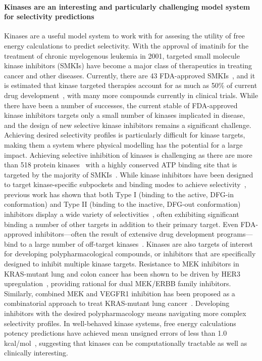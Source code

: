 \documentclass[9pt,lineno]{elife-modified} %
\begin{document}
\paragraph{Kinases are an interesting and particularly challenging model system for selectivity predictions}
Kinases are a useful model system to work with for assesing the utility of free energy calculations to predict selectivity. With the approval of imatinib for the treatment of chronic myelogenous leukemia in 2001, targeted small molecule kinase inhibitors (SMKIs) have become a major class of therapeutics in treating cancer and other diseases. 
Currently, there are 43 FDA-approved SMKIs~\citep{fda-approved-kinase-inhibitors}, and it is estimated that kinase targeted therapies account for as much as 50\% of current drug development~\citep{Santos:Nat.Rev.DrugDiscov.:2016}, with many more compounds currently in clinical trials. 
While there have been a number of successes, the current stable of FDA-approved kinase inhibitors targets only a small number of kinases implicated in disease, and the design of new selective kinase inhibitors remains a significant challenge.
Achieving desired selectivity profiles is particularly difficult for kinase targets, making them a system where physical modelling has the potential for a large impact. Achieving selective inhibition of kinases is challenging as there are more than 518 protein kinases~\citep{Volkamer2015-jx,Manning2002-cw} with a highly conserved ATP binding site that is targeted by the majority of SMKIs~\citep{Wu2015-oq}.
While kinase inhibitors have been designed to target kinase-specific subpockets and binding modes to achieve selectivity~\citep{Cowan-Jacob2007-rn,Seeliger2007-jn,Huse2002-ml,Harrison2003-ct,Volkamer2016-sj,ChristmannFranck:2016gka}, previous work has shown that both Type I (binding to the active, DFG-in conformation) and Type II (binding to the inactive, DFG-out conformation) inhibitors display a wide variety of selectivities~\citep{Anastassiadis2011-sm,Davis:Nat.Biotechnol.:2011}, often exhibiting significant binding a number of other targets in addition to their primary target. 
Even FDA-approved inhibitors---often the result of extensive drug development programs---bind to a large number of off-target kinases~\citep{Klaeger2017-jr}. Kinases are also targets of interest for developing polypharmacological compounds, or inhibitors that are specifically designed to inhibit multiple kinase targets. Resistance to MEK inhibitors in KRAS-mutant lung and colon cancer has been shown to be driven by HER3 upregulation~\citep{Sun:2014kt}, providing rational for dual MEK/ERBB family inhibitors. Similarly, combined MEK and VEGFR1 inhibition has been proposed as a combinatorial approach to treat KRAS-mutant lung cancer~\citep{Manchado:2016fb}. Developing inhibitors with the desired polypharmacology means navigating more complex selectivity profiles. In well-behaved kinase systems, free energy calculations potency predictions have achieved mean unsigned errors of less than 1.0 kcal/mol~\citep{Wang:J.Am.Chem.Soc.:2015,Abel2017-gw}, suggesting that kinases can be computationally tractable as well as clinically interesting. 
\end{document}
